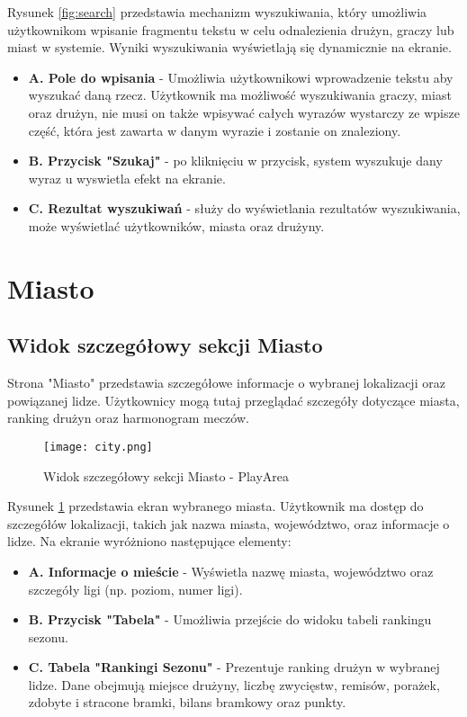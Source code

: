 \documentclass[wmii,inf,inz]{uwmthesis} %
\begin{document}
\noindent Rysunek \ref{fig:search} przedstawia mechanizm wyszukiwania, który umożliwia użytkownikom wpisanie fragmentu tekstu w celu odnalezienia drużyn, graczy lub miast w systemie. Wyniki wyszukiwania wyświetlają się dynamicznie na ekranie.
\begin{itemize}
    \item \textbf{A. Pole do wpisania} - Umożliwia użytkownikowi wprowadzenie tekstu aby wyszukać daną rzecz. Użytkownik ma możliwość wyszukiwania graczy, miast oraz drużyn, nie musi on także wpisywać całych wyrazów wystarczy ze wpisze część, która jest zawarta w danym wyrazie i zostanie on znaleziony.
    \item \textbf{B. Przycisk "Szukaj"} - po kliknięciu w przycisk, system wyszukuje dany wyraz u wyswietla efekt na ekranie.
    \item \textbf{C. Rezultat wyszukiwań} - służy do wyświetlania rezultatów wyszukiwania,
    może wyświetlać użytkowników, miasta oraz drużyny.
\end{itemize}
\section{Miasto}

\subsection{Widok szczegółowy sekcji Miasto}
Strona "Miasto" przedstawia szczegółowe informacje o wybranej lokalizacji oraz powiązanej lidze. Użytkownicy mogą tutaj przeglądać szczegóły dotyczące miasta, ranking drużyn oraz harmonogram meczów.

\begin{figure}[H]
    \centering
    \texttt{[image: city.png]}
    \caption{Widok szczegółowy sekcji Miasto - PlayArea}
    \label{fig:city_details}
\end{figure}

\noindent
Rysunek \ref{fig:city_details} przedstawia ekran wybranego miasta. Użytkownik ma dostęp do szczegółów lokalizacji, takich jak nazwa miasta, województwo, oraz informacje o lidze. Na ekranie wyróżniono następujące elementy:
\begin{itemize}
    \item \textbf{A. Informacje o mieście} - Wyświetla nazwę miasta, województwo oraz szczegóły ligi (np. poziom, numer ligi).
    \item \textbf{B. Przycisk "Tabela"} - Umożliwia przejście do widoku tabeli rankingu sezonu.
    \item \textbf{C. Tabela "Rankingi Sezonu"} - Prezentuje ranking drużyn w wybranej lidze. Dane obejmują miejsce drużyny, liczbę zwycięstw, remisów, porażek, zdobyte i stracone bramki, bilans bramkowy oraz punkty.
\end{itemize}
\end{document}
